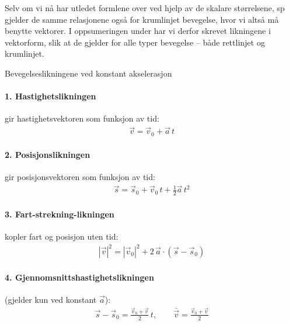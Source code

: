 Selv om vi nå har utledet formlene over ved hjelp av de skalare størrelsene, sp gjelder de samme relasjonene også for krumlinjet bevegelse, hvor vi altså må benytte vektorer. I oppsumeringen under har vi derfor skrevet likningene i vektorform, slik at de gjelder for alle typer bevegelse – både rettlinjet og krumlinjet.
\begin{myoppsum*}{Bevegelseslikningene ved konstant akselerasjon}
\paragraph{1. Hastighetslikningen} gir hastighetsvektoren som funksjon av tid:
    \begin{align}
        \vec{v} = \vec{v}_0 + \vec{a}\,t
    \end{align}

\paragraph{2. Posisjonslikningen} gir posisjonsvektoren som funksjon av tid:
    \begin{align}
        \vec{s} = \vec{s}_0 + \vec{v}_0\,t + \tfrac{1}{2}\vec{a}\,t^2
    \end{align}

\paragraph{3. Fart-strekning-likningen} kopler fart og posisjon uten tid:
    \begin{align}
       |\vec{v}|^2 = |\vec{v}_0|^2 + 2\,\vec{a} \cdot (\vec{s} - \vec{s}_0)
    \end{align}

\paragraph{4. Gjennomsnittshastighetslikningen} (gjelder kun ved konstant $\vec{a}$):
    \begin{align}
        \vec{s} - \vec{s}_0 = \frac{\vec{v}_0 + \vec{v}}{2}\,t, \qquad \bar{\vec{v}} = \frac{\vec{v}_0 + \vec{v}}{2}
    \end{align}
\end{myoppsum*}


